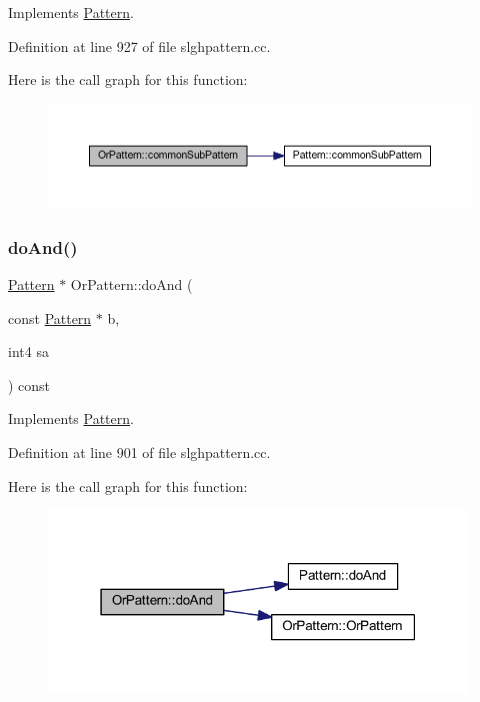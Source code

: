 Implements \mbox{\hyperlink{class_pattern_a54daed6fc84146ad309a25dfa8a68052}{Pattern}}.



Definition at line 927 of file slghpattern.\+cc.

Here is the call graph for this function\+:
\nopagebreak
\begin{figure}[H]
\begin{center}
\leavevmode
\includegraphics[width=350pt]{class_or_pattern_a298d0540c485a3e056410848a4870c92_cgraph}
\end{center}
\end{figure}
\mbox{\label{class_or_pattern_a8375a0c2a661775d1211535540d68d3c}} 
\subsubsection{\texorpdfstring{doAnd()}{doAnd()}}
{\footnotesize\ttfamily \mbox{\hyperlink{class_pattern}{Pattern}} $\ast$ Or\+Pattern\+::do\+And (\begin{DoxyParamCaption}\item[{const \mbox{\hyperlink{class_pattern}{Pattern}} $\ast$}]{b,  }\item[{int4}]{sa }\end{DoxyParamCaption}) const\hspace{0.3cm}{\ttfamily [virtual]}}



Implements \mbox{\hyperlink{class_pattern_a960f3e000e2642c452fe11f5b55a9589}{Pattern}}.



Definition at line 901 of file slghpattern.\+cc.

Here is the call graph for this function\+:
\nopagebreak
\begin{figure}[H]
\begin{center}
\leavevmode
\includegraphics[width=315pt]{class_or_pattern_a8375a0c2a661775d1211535540d68d3c_cgraph}
\end{center}
\end{figure}
\mbox{\label{class_or_pattern_a969bd58751ab797ec77e4c0c74168410}} 
